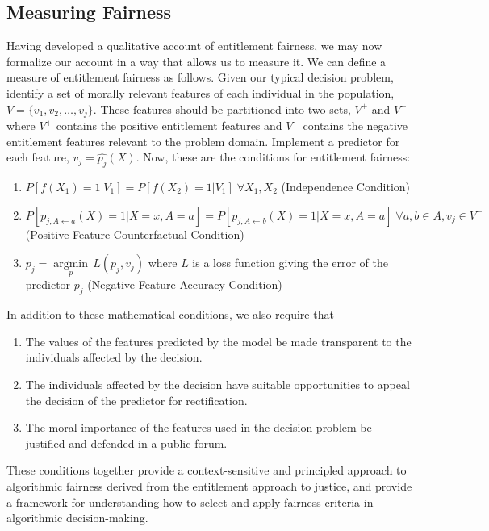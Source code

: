 \subsection{Measuring Fairness}

Having developed a qualitative account of entitlement fairness, we may now
formalize our account in a way that allows us to measure it. We can
define a measure of entitlement fairness as follows. Given our typical decision
problem, identify a set of morally relevant features of each individual in the
population, $V = \{v_1, v_2, \ldots, v_j\}$. These features should be
partitioned into two sets, $V^+$ and $V^-$ where $V^+$ contains the positive
entitlement features and $V^-$ contains the negative entitlement features 
relevant to the problem domain. Implement a predictor for each feature,
$v_j = \hat{p_j}(X)$. Now, these are the conditions for entitlement fairness:
\begin{enumerate}
    \item $P[f(X_1) = 1 | V_1] = P[f(X_2) = 1 | V_1]\;\forall X_1, X_2$ (Independence Condition)
    \item $P[p_{j, A\leftarrow a}(X) = 1 | X=x, A=a] = P[p_{j, A\leftarrow b}(X) = 1 | X=x, A=a]\;\forall a, b \in A, v_j \in V^+$ (Positive Feature Counterfactual Condition)
    \item $p_j = \underset{p}{\operatorname{argmin}}\, L(p_j, v_j)$ where $L$ is a loss function giving the error of the predictor $p_j$ (Negative Feature Accuracy Condition)
\end{enumerate}
In addition to these mathematical conditions, we also require that
\begin{enumerate}
    \item The values of the features predicted by the model be made
    transparent to the individuals affected by the decision.
    \item The individuals affected by the decision have suitable opportunities
    to appeal the decision of the predictor for rectification.
    \item The moral importance of the features used in the decision problem be 
    justified and defended in a public forum. 
\end{enumerate}

These conditions together provide a context-sensitive and principled approach to
algorithmic fairness derived from the entitlement approach to justice, and 
provide a framework for understanding how to select and apply fairness criteria
in algorithmic decision-making.
